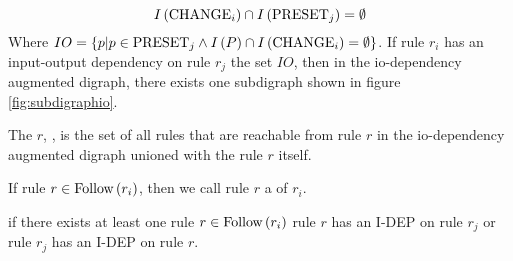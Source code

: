 \begin{defi}
 \iffTx{}
\begin{equation}
I\left(\mbox{CHANGE}_i\right)\cap I\left(\mbox{PRESET}_j\right)=\emptyset
\end{equation}
Where $IO=\left\{ p|p\in\mbox{PRESET}_j\wedge I\left(P\right)\cap I\left(\mbox{CHANGE}_i\right)=\emptyset\right\}$. If rule $r_i$ has an input-output dependency on rule $r_j$ \wrtTx{} the set $IO$, then in the io-dependency augmented digraph, there exists one subdigraph shown in figure \ref{fig:subdigraphio}.
\cite{conf/ijcai/HsuW89}
\end{defi}

\begin{defi}
The  $r$, , is the set of all rules that are reachable from rule $r$ in the io-dependency augmented digraph unioned with the rule $r$ itself.
\cite{conf/ijcai/HsuW89}
\end{defi}

\begin{defi}
If rule $r\in\mbox{Follow}\left(r_i\right)$, then we call rule $r$ a  of $r_i$.
\cite{conf/ijcai/HsuW89}
\end{defi}

\begin{defi}
  if there exists at least one rule $r\in\mbox{Follow}\left(r_i\right)$ \stTx{} rule $r$ has an I-DEP on rule $r_j$ or rule $r_j$ has an I-DEP on rule $r$.
\cite{conf/ijcai/HsuW89}
\end{defi}

